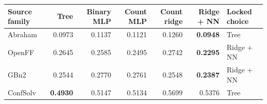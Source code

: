 \begin{tabularx}{\textwidth}{@{}lrrrrrX@{}}
\toprule
Source family & Tree & Binary MLP & Count MLP & Count ridge & Ridge + NN & Locked choice \\
\midrule
Abraham & 0.0973 & 0.1137 & 0.1121 & 0.1260 & \textbf{0.0948} & Tree \\
OpenFF & 0.2645 & 0.2585 & 0.2495 & 0.2742 & \textbf{0.2295} & Ridge + NN \\
GBn2 & 0.2544 & 0.2770 & 0.2761 & 0.2548 & \textbf{0.2387} & Ridge + NN \\
ConfSolv & \textbf{0.4930} & 0.5147 & 0.5134 & 0.5699 & 0.5376 & Tree \\
\bottomrule
\end{tabularx}
